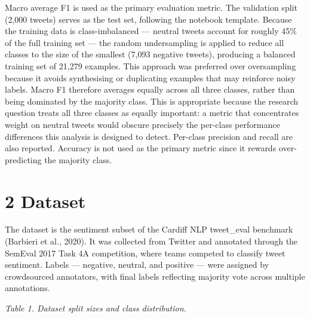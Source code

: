 \documentclass[
  12pt,
]{article}
\begin{document}
Macro average F1 is used as the primary evaluation metric. The
validation split (2,000 tweets) serves as the test set, following the
notebook template. Because the training data is class-imbalanced ---
neutral tweets account for roughly 45\% of the full training set --- the
random undersampling is applied to reduce all classes to the size of
the smallest (7,093 negative tweets), producing a balanced training set
of 21,279 examples. This approach was preferred over oversampling
because it avoids synthesising or duplicating examples that may
reinforce noisy labels. Macro F1 therefore averages equally across all
three classes, rather than being dominated by the majority class. This
is appropriate because the research question treats all three classes as
equally important: a metric that concentrates weight on neutral tweets
would obscure precisely the per-class performance differences this
analysis is designed to detect. Per-class precision and recall are also
reported. Accuracy is not used as the primary metric since it rewards
over-predicting the majority class.

\section{2 Dataset}\label{dataset}

The dataset is the sentiment subset of the Cardiff NLP tweet\_eval
benchmark (Barbieri et al., 2020). It was collected from Twitter and
annotated through the SemEval 2017 Task 4A competition, where teams
competed to classify tweet sentiment. Labels --- negative, neutral, and
positive --- were assigned by crowdsourced annotators, with final labels
reflecting majority vote across multiple annotations.

\emph{Table 1. Dataset split sizes and class distribution.}
\end{document}
